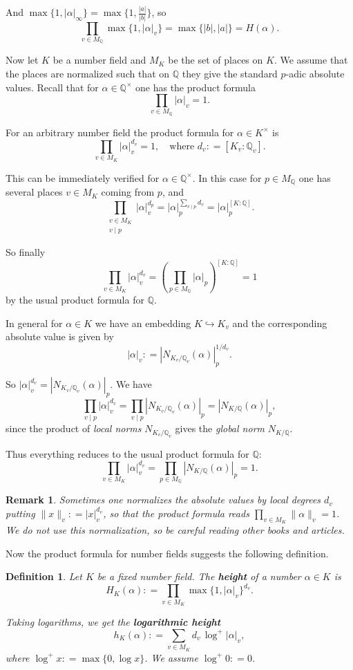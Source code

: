 \documentclass{article}
\newcommand{\term}{\textbf}
\newcommand{\dfn}{\mathrel{\mathop:}=}
\newcommand{\QQ}{\mathbb{Q}}
\theoremstyle{myplain}
\theoremstyle{mydefinition}
\newtheorem{definition}[proposition]{Definition}
\newtheorem{remark}[proposition]{Remark}
\begin{document}
And $\max \{ 1, |\alpha|_\infty \} = \max \{ 1, \frac{|a|}{|b|} \}$, so
$$\prod_{v\in M_\QQ} \max \{ 1, |\alpha|_v \} = \max \{ |b|, |a| \} = H (\alpha).$$

Now let $K$ be a number field and $M_K$ be the set of places on $K$. We assume
that the places are normalized such that on $\QQ$ they give the standard
$p$-adic absolute values. Recall that for $\alpha \in \QQ^\times$ one has the
product formula
$$\prod_{v \in M_\QQ} |\alpha|_v = 1.$$

For an arbitrary number field the product formula for $\alpha \in K^\times$
is\label{product-formula-K}
$$\prod_{v \in M_K} |\alpha|_v^{d_v} = 1, \quad \text{where } d_v \dfn [K_v : \QQ_v].$$

This can be immediately verified for $\alpha \in \QQ^\times$. In this case for
$p \in M_\QQ$ one has several places $v \in M_K$ coming from $p$, and
\[ \prod_{\substack{v \in M_K \\ v \mid p}} |\alpha|_v^{d_p} =
  |\alpha|_p^{\sum_{v\mid p} d_v} = |\alpha|_p^{[K:\QQ]}. \]

So finally
\[ \prod_{v \in M_K} |\alpha|_v^{d_v} =
  \left( \prod_{p\in M_\QQ} |\alpha|_p \right)^{[K:\QQ]} = 1 \]
by the usual product formula for $\QQ$.

In general for $\alpha \in K$ we have an embedding $K \hookrightarrow K_v$ and
the corresponding absolute value is given by
$$|\alpha|_v \dfn |N_{K_v/\QQ_v} (\alpha)|_p^{1/d_v}.$$

So $|\alpha|_v^{d_v} = |N_{K_v/\QQ_v} (\alpha)|_p$. We have
\[ \prod_{v \mid p} |\alpha|_v^{d_v} =
  \prod_{v \mid p} |N_{K_v / \QQ_v} (\alpha)|_p =
  |N_{K/\QQ} (\alpha)|_p, \]
since the product of \emph{local norms} $N_{K_v / \QQ_v}$ gives the
\emph{global norm} $N_{K/\QQ}$.

Thus everything reduces to the usual product formula for $\QQ$:
$$\prod_{v \in M_K} |\alpha|_v^{d_v} = \prod_{p\in M_\QQ} |N_{K/\QQ} (\alpha)|_p = 1.$$

\begin{remark}
  Sometimes one normalizes the absolute values by local degrees $d_v$ putting
  $\|x\|_v \dfn |x|_v^{d_v}$, so that the product formula reads
  $\prod_{v\in M_K} \|\alpha\|_v = 1$. We do not use this normalization, so be
  careful reading other books and articles.
\end{remark}

Now the product formula for number fields suggests the following definition.

\begin{definition}
  Let $K$ be a fixed number field. The \term{height} of a number $\alpha \in K$
  is
  $$H_K (\alpha) \dfn \prod_{v\in M_K} \max \{ 1, |\alpha|_v \}^{d_v}.$$

  Taking logarithms, we get the \term{logarithmic height}
  $$h_K (\alpha) \dfn \sum_{v\in M_K} d_v \, \log^+ |\alpha|_v,$$
  where $\log^+ x \dfn \max \{ 0, \log x \}$. We assume $\log^+ 0 \dfn 0$.
\end{definition}
\end{document}
